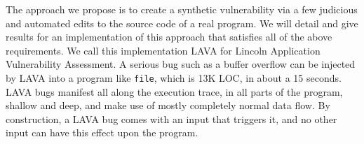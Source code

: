 The approach we propose is to create a synthetic vulnerability via a few judicious and automated edits to the source code of a real program.
We will detail and give results for an implementation of this approach that satisfies all of the above requirements.
We call this implementation LAVA for Lincoln Application Vulnerability Assessment.    
A serious bug such as a buffer overflow can be injected by LAVA into a program like \verb+file+, which is 13K LOC, in about a 15 seconds.
LAVA bugs manifest all along the execution trace, in all parts of the program, shallow and deep, and make use of mostly completely normal data flow.
By construction, a LAVA bug comes with an input that triggers it, and no other input can have this effect upon the program.
